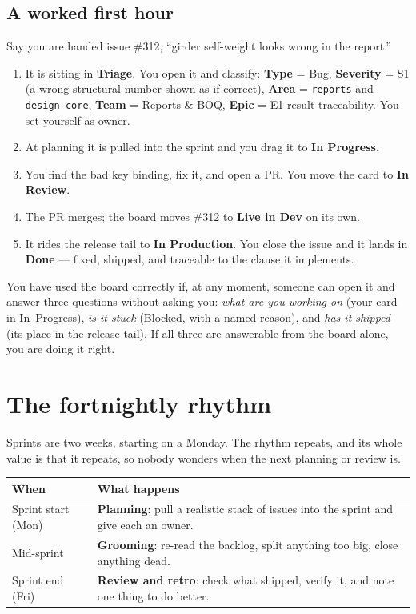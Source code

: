 \documentclass[11pt,a4paper]{report}
\newcommand{\code}[1]{\texttt{#1}}
\newcommand{\fieldname}[1]{\textbf{#1}}
\begin{document}
\section{A worked first hour}

Say you are handed issue \#312, ``girder self-weight looks wrong in the report.''

\begin{enumerate}[leftmargin=1.7em,itemsep=3pt]
  \item It is sitting in \textbf{Triage}. You open it and classify: \fieldname{Type}
        = Bug, \fieldname{Severity} = S1 (a wrong structural number shown as if
        correct), \fieldname{Area} = \code{reports} and \code{design-core},
        \fieldname{Team} = Reports \& BOQ, \fieldname{Epic} = E1
        result-traceability. You set yourself as owner.
  \item At planning it is pulled into the sprint and you drag it to
        \textbf{In Progress}.
  \item You find the bad key binding, fix it, and open a PR. You move the card to
        \textbf{In Review}.
  \item The PR merges; the board moves \#312 to \textbf{Live in Dev} on its own.
  \item It rides the release tail to \textbf{In Production}. You close the issue and
        it lands in \textbf{Done} --- fixed, shipped, and traceable to the clause it
        implements.
\end{enumerate}

\begin{verifybox}
You have used the board correctly if, at any moment, someone can open it and answer
three questions without asking you: \emph{what are you working on} (your card in
In~Progress), \emph{is it stuck} (Blocked, with a named reason), and \emph{has it
shipped} (its place in the release tail). If all three are answerable from the board
alone, you are doing it right.
\end{verifybox}

\chapter{The fortnightly rhythm}

Sprints are two weeks, starting on a Monday. The rhythm repeats, and its whole value
is that it repeats, so nobody wonders when the next planning or review is.

\begin{center}
\begin{tabular}{@{}p{3.2cm}p{10.2cm}@{}}
\toprule
\textbf{When} & \textbf{What happens} \\
\midrule
Sprint start (Mon) & \textbf{Planning}: pull a realistic stack of issues into the sprint and give each an owner. \\
Mid-sprint & \textbf{Grooming}: re-read the backlog, split anything too big, close anything dead. \\
Sprint end (Fri) & \textbf{Review and retro}: check what shipped, verify it, and note one thing to do better. \\
\bottomrule
\end{tabular}
\end{center}
\end{document}
